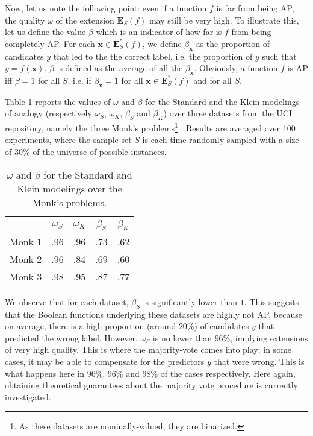 \documentclass[article]{amsart}
\begin{document}
Now, let us note the following point: even if a function $f$ is far from being
AP, the quality $\omega$ of the extension $\mathbf{E}_S(f)$ may still be very
high. To illustrate this, let us define the value $\beta$ which is an indicator
of how far is $f$ from being completely AP.  For each $\mathbf{x} \in
\mathbf{E}^*_S(f)$, we define $\beta_\mathbf{x}$ as the proportion of
candidates $y$ that led to the the correct label, i.e. the proportion of $y$
such that $y = f(\mathbf{x})$. $\beta$ is defined as the average of all the
$\beta_\mathbf{x}$.  Obviously, a function $f$ is AP iff $\beta = 1$ for all
$S$, i.e. if $\beta_\mathbf{x} = 1$ for all $\mathbf{x} \in \mathbf{E}^*_S(f)$
and for all $S$.

Table \ref{table_monks} reports the values of $\omega$ and $\beta$ for the
Standard and the Klein modelings of analogy (respectively $\omega_S$,
$\omega_K$, $\beta_S$ and $\beta_K$) over three datasets from the UCI
repository, namely the three Monk's problems\footnote{As these datasets are
nominally-valued, they are binarized.} \cite{UCIrepo}. Results are averaged
over 100 experiments, where the sample set $S$ is each time randomly sampled
with a size of $30$\% of the universe of possible instances.

\begin{table}
\centering
\begin{tabular}{| c | c | c | c | c |}
\toprule
  & $\omega_S$  & $\omega_K$ & $\beta_S$  &  $\beta_K$ \\
\midrule
Monk 1 & .96 & .96 & .73 & .62 \\
Monk 2 & .96 & .84 & .69 & .60 \\
Monk 3 & .98 & .95 & .87 & .77 \\
\bottomrule
\end{tabular}
\caption{$\omega$ and $\beta$ for the Standard and Klein modelings over the
  Monk's problems.}
\label{table_monks}
\end{table}

We observe that for each dataset, $\beta_S$ is significantly lower than $1$.
This suggests that the Boolean functions underlying these
datasets are highly not AP, because on average, there is a high proportion
(around $20$\%) of candidates $y$ that predicted the wrong label. However,
$\omega_S$ is no lower than $96$\%, implying extensions of very high quality.
This is where the majority-vote comes into play: in some cases, it may be able
to compensate for the predictors $y$ that were wrong.  This is what happens
here in $96$\%, $96$\% and $98$\% of the cases respectively. Here again,
obtaining theoretical guarantees about the majority vote procedure is currently
investigated.
\end{document}
